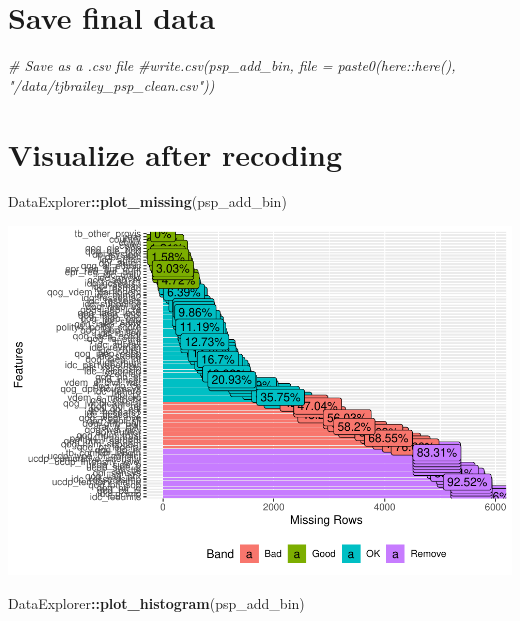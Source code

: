 \documentclass[
]{article}
\newenvironment{Shaded}{\begin{snugshade}}{\end{snugshade}}
\newcommand{\CommentTok}[1]{\textcolor[rgb]{0.56,0.35,0.01}{\textit{#1}}}
\newcommand{\KeywordTok}[1]{\textcolor[rgb]{0.13,0.29,0.53}{\textbf{#1}}}
\newcommand{\NormalTok}[1]{#1}
\newcommand{\OperatorTok}[1]{\textcolor[rgb]{0.81,0.36,0.00}{\textbf{#1}}}
\begin{document}
\hypertarget{save-final-data}{%
\section{Save final data}\label{save-final-data}}

\begin{Shaded}
\begin{Highlighting}[]
\CommentTok{# Save as a .csv file }
\CommentTok{#write.csv(psp_add_bin, file = paste0(here::here(), "/data/tjbrailey_psp_clean.csv"))}
\end{Highlighting}
\end{Shaded}

\hypertarget{visualize-after-recoding}{%
\section{Visualize after recoding}\label{visualize-after-recoding}}

\begin{Shaded}
\begin{Highlighting}[]
\NormalTok{DataExplorer}\OperatorTok{::}\KeywordTok{plot_missing}\NormalTok{(psp_add_bin)}
\end{Highlighting}
\end{Shaded}

\includegraphics{01_tjbrailey_wrangle_data_files/figure-latex/unnamed-chunk-18-1.pdf}

\begin{Shaded}
\begin{Highlighting}[]
\NormalTok{DataExplorer}\OperatorTok{::}\KeywordTok{plot_histogram}\NormalTok{(psp_add_bin)}
\end{Highlighting}
\end{Shaded}
\end{document}
